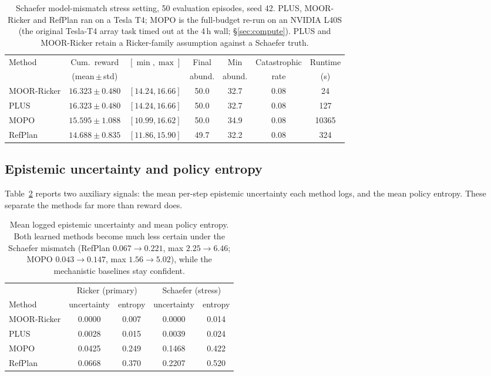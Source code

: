 \documentclass[11pt]{article}
\begin{document}
\begin{table}[h]
\centering
\small
\begin{tabular}{lcccccc}
\toprule
Method & Cum.\ reward & $[\min,\max]$ & Final & Min & Catastrophic & Runtime \\
       & (mean\,$\pm$\,std) &        & abund. & abund. & rate & (s) \\
\midrule
MOOR-Ricker & $16.323 \pm 0.480$ & $[14.24, 16.66]$ & 50.0 & 32.7 & 0.08 & 24 \\
PLUS        & $16.323 \pm 0.480$ & $[14.24, 16.66]$ & 50.0 & 32.7 & 0.08 & 127 \\
MOPO        & $15.595 \pm 1.088$ & $[10.99, 16.62]$ & 50.0 & 34.9 & 0.08 & 10365 \\
RefPlan     & $14.688 \pm 0.835$ & $[11.86, 15.90]$ & 49.7 & 32.2 & 0.08 & 324 \\
\bottomrule
\end{tabular}
\caption{Schaefer model-mismatch stress setting, 50 evaluation episodes, seed 42.
PLUS, MOOR-Ricker and RefPlan ran on a Tesla T4; MOPO is the full-budget re-run on
an NVIDIA L40S (the original Tesla-T4 array task timed out at the 4\,h wall;
\S\ref{sec:compute}). PLUS and MOOR-Ricker retain a Ricker-family assumption
against a Schaefer truth.}
\label{tab:schaefer}
\end{table}

\subsection{Epistemic uncertainty and policy entropy}
Table~\ref{tab:unc} reports two auxiliary signals: the mean per-step epistemic
uncertainty each method logs, and the mean policy entropy. These separate the
methods far more than reward does.

\begin{table}[h]
\centering
\small
\begin{tabular}{lcccc}
\toprule
 & \multicolumn{2}{c}{Ricker (primary)} & \multicolumn{2}{c}{Schaefer (stress)} \\
\cmidrule(lr){2-3}\cmidrule(lr){4-5}
Method & uncertainty & entropy & uncertainty & entropy \\
\midrule
MOOR-Ricker & 0.0000 & 0.007 & 0.0000 & 0.014 \\
PLUS        & 0.0028 & 0.015 & 0.0039 & 0.024 \\
MOPO        & 0.0425 & 0.249 & 0.1468 & 0.422 \\
RefPlan     & 0.0668 & 0.370 & 0.2207 & 0.520 \\
\bottomrule
\end{tabular}
\caption{Mean logged epistemic uncertainty and mean policy entropy. Both learned
methods become much less certain under the Schaefer mismatch (RefPlan
$0.067\to0.221$, max $2.25\to6.46$; MOPO $0.043\to0.147$, max $1.56\to5.02$),
while the mechanistic baselines stay confident.}
\label{tab:unc}
\end{table}
\end{document}
